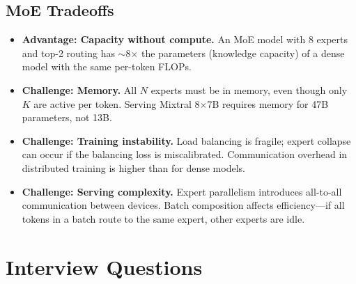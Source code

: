 \subsection{MoE Tradeoffs}

\begin{itemize}[leftmargin=*]
\item \textbf{Advantage: Capacity without compute.}  An MoE model with 8
  experts and top-2 routing has $\sim$8$\times$ the parameters (knowledge
  capacity) of a dense model with the same per-token FLOPs.

\item \textbf{Challenge: Memory.}  All $N$ experts must be in memory, even
  though only $K$ are active per token.  Serving Mixtral 8$\times$7B requires
  memory for 47B parameters, not 13B.

\item \textbf{Challenge: Training instability.}  Load balancing is fragile;
  expert collapse can occur if the balancing loss is miscalibrated.
  Communication overhead in distributed training is higher than for dense
  models.

\item \textbf{Challenge: Serving complexity.}  Expert parallelism introduces
  all-to-all communication between devices.  Batch composition affects
  efficiency---if all tokens in a batch route to the same expert, other
  experts are idle.
\end{itemize}


\section{Interview Questions}
\label{sec:llm_icl_interview}

